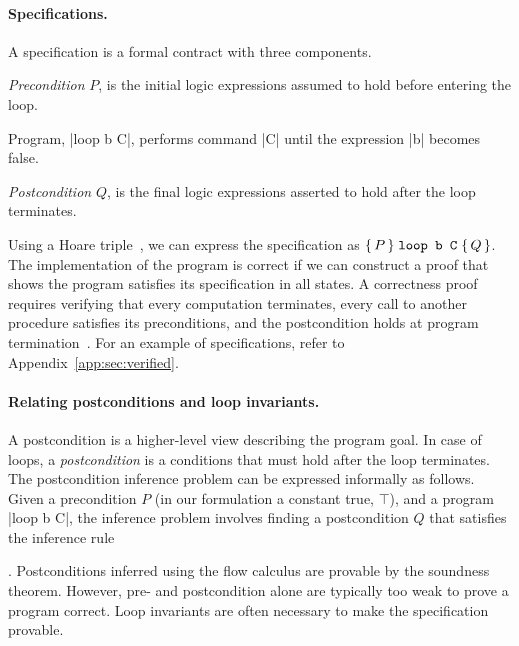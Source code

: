 \paragraph*{Specifications.}
A {specification} is a formal contract with three components.
\begin{enumerate*}
    \item \emph{Precondition} \(P\), is the initial logic expressions assumed to hold before entering the loop.
    \item Program, \pr|loop b C|, performs command \pr|C| until the expression \pr|b| becomes false.
    \item \emph{Postcondition} \(Q\), is the final logic expressions asserted to hold after the loop terminates.
\end{enumerate*}
Using a {Hoare triple}~\cite{hoare1969}, we can express the specification as \(\Hoare{P}{\prm{loop b C}}{Q}\).
The implementation of the program is correct if we can construct a proof that shows the program satisfies its specification in all states.
A correctness proof requires verifying that every computation terminates, every call to another procedure satisfies its preconditions, and the postcondition holds at program termination~\cite{furia2010}.
For an example of specifications, refer to Appendix~\ref{app:sec:verified}.

\paragraph*{Relating postconditions and loop invariants.}
A postcondition is a higher-level view describing the program goal.
In case of loops, a \emph{postcondition} is a conditions that must hold after the loop terminates.
The postcondition inference problem can be expressed informally as follows.
Given a precondition \(P\) (in our formulation a constant true, \(\top\)), and a program \pr|loop b C|,
the inference problem involves finding a postcondition \(Q\) that satisfies the inference rule
\begin{prooftree} %
\end{prooftree}.
Postconditions inferred using the flow calculus are provable by the soundness theorem.
However, pre- and postcondition alone are typically too weak to prove a program correct.
Loop invariants are often necessary to make the specification provable.

